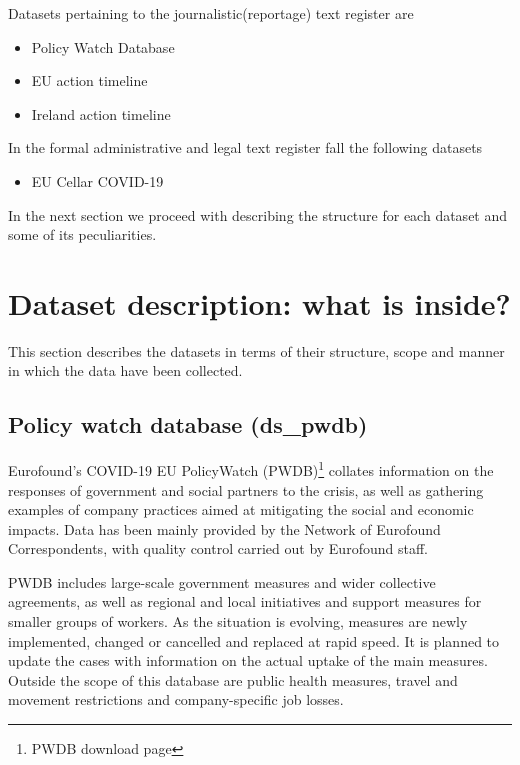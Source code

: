 Datasets pertaining to the journalistic(reportage) text register are

\begin{itemize}
	\item Policy Watch Database 
	\item EU action timeline

	\item Ireland action timeline
\end{itemize}

In the formal administrative and legal text register fall the following datasets

\begin{itemize}
	\item EU Cellar COVID-19 
\end{itemize}

In the next section we proceed with describing the structure for each dataset and some of its peculiarities.

\section{Dataset description: what is inside? }

This section describes the datasets in terms of their structure, scope and manner in which the data have been collected. 

\subsection{Policy watch database (ds\_pwdb)}

Eurofound's COVID-19 EU PolicyWatch (PWDB)\footnote{ PWDB download page  } collates information on the responses of government and social partners to the crisis, as well as gathering examples of company practices aimed at mitigating the social and economic impacts. Data has been mainly provided by the Network of Eurofound Correspondents, with quality control carried out by Eurofound staff.

PWDB includes large-scale government measures and wider collective agreements, as well as regional and local initiatives and support measures for smaller groups of workers. As the situation is evolving, measures are newly implemented, changed or cancelled and replaced at rapid speed. It is planned to update the cases with information on the actual uptake of the main measures. Outside the scope of this database are public health measures, travel and movement restrictions and company-specific job losses. 

